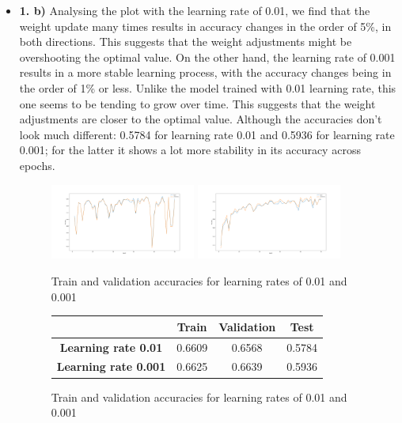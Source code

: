 \documentclass[12pt]{article}
\begin{document}
\begin{itemize}
    \item \textbf{1. b)} Analysing the plot with the learning rate of 0.01, we find that the weight update many times results in accuracy changes in the order of 5\%, in both directions. This suggests that the weight adjustments might be overshooting the optimal value. On the other hand, the learning rate of 0.001 results in a more stable learning process, with the accuracy changes being in the order of 1\% or less. Unlike the model trained with 0.01 learning rate, this one seems to be tending to grow over time. This suggests that the weight adjustments are closer to the optimal value. Although the accuracies don't look much different: 0.5784 for learning rate 0.01 and 0.5936 for learning rate 0.001; for the latter it shows a lot more stability in its accuracy across epochs.
    \begin{figure}[h]
        \centering
        \includegraphics[width=0.45\textwidth]{../outputs/hw1-q1-1b.01.png}
        \includegraphics[width=0.45\textwidth]{../outputs/hw1-q1-1b.001.png}
        \caption{Train and validation accuracies for learning rates of 0.01 and 0.001}
        \label{fig:1b}
    \end{figure}
    \begin{figure}[h]
        \centering
        \begin{tabular}{|c|c|c|c|}
            \toprule
            & \textbf{Train} & \textbf{Validation} & \textbf{Test} \\
            \midrule
            \textbf{Learning rate 0.01} & 0.6609 & 0.6568 & 0.5784 \\
            \textbf{Learning rate 0.001} & 0.6625 & 0.6639 & 0.5936 \\
            \bottomrule
        \end{tabular}
        \label{tab:1b}
        \caption{Train and validation accuracies for learning rates of 0.01 and 0.001}

\end{figure}
\end{itemize}
\end{document}
